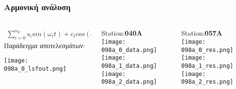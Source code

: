 \begin{frame}
  \frametitle{Αρμονική ανάλυση}
  \framesubtitle{}
  \label{}
  \vskip-1cm
  \begin{columns}[T]
    \begin{column}{.33\textwidth}
      \begin{align*}
        \sum_{i=0}^{n_F} s_{i} sin(\omega_{i}t) + c_{i} cos(\omega_{i}t)
      \end{align*}
      Παράδειγμα αποτελεσμάτων:
       \begin{center}
         \texttt{[image: 098a\_0\_lsfout.png]}
       \end{center}
    \end{column}
    \begin{column}{.33\textwidth}
      \begin{center}
      Station:\textbf{040A}\\
         \texttt{[image: 098a\_0\_data.png]}\\
         \texttt{[image: 098a\_1\_data.png]}\\
         \texttt{[image: 098a\_2\_data.png]}
       \end{center} 
    \end{column}
    \begin{column}{.33\textwidth}
      \begin{center}
      Station:\textbf{057A}\\
         \texttt{[image: 098a\_0\_res.png]}\\
         \texttt{[image: 098a\_1\_res.png]}\\
         \texttt{[image: 098a\_2\_res.png]}
       \end{center} 
    \end{column}
  \end{columns}
\end{frame}
\note{}


